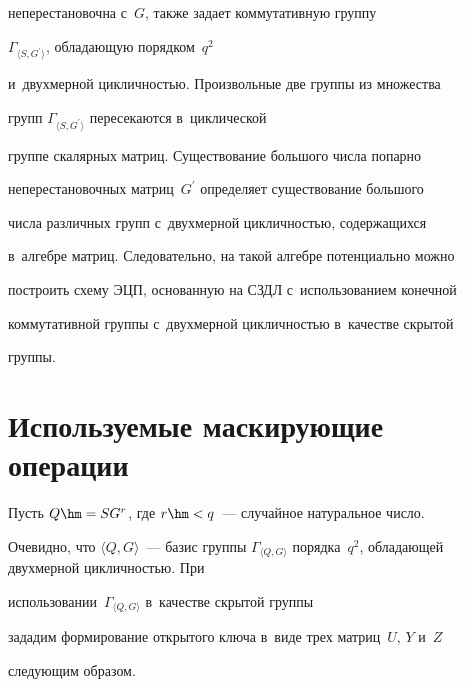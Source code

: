 неперестановочна с~$G$, также задает коммутативную группу 


$\Gamma_{\langle S, G^\prime\rangle}$, обла\-да\-ющую порядком~$q^2$ 


и~двухмерной цик\-лич\-ностью. Произвольные две группы из множества 


групп $\Gamma_{\langle S, G^\prime\rangle}$ пересекаются в~цик\-ли\-че\-ской 


группе скалярных мат\-риц. Существование большого чис\-ла попарно 


неперестановочных мат\-риц~$G^\prime$ определяет существование большого 


числа различных групп с~двухмерной цик\-лич\-ностью, содержащихся 


в~алгебре мат\-риц. Следовательно, на такой алгебре потенциально можно 


построить схему ЭЦП, основанную на СЗДЛ с~использованием конечной 


коммутативной группы с~двухмерной цик\-лич\-ностью в~качестве скрытой 


группы.





\section{Используемые маскирующие операции}





   Пусть $Q\hm= SG^r$, где $r\hm< q$~--- случайное натуральное число. 


Очевидно, что $\langle Q, G\rangle$~--- базис группы $\Gamma_{\langle Q, 


G\rangle}$ порядка~$q^2$, обладающей двухмерной цик\-лич\-ностью. При 


использовании~$\Gamma_{\langle Q, G\rangle}$ в~качестве скрытой группы 


зададим формирование открытого ключа в~виде трех мат\-риц~$U$, $Y$ и~$Z$ 


сле\-ду\-ющим образом.


